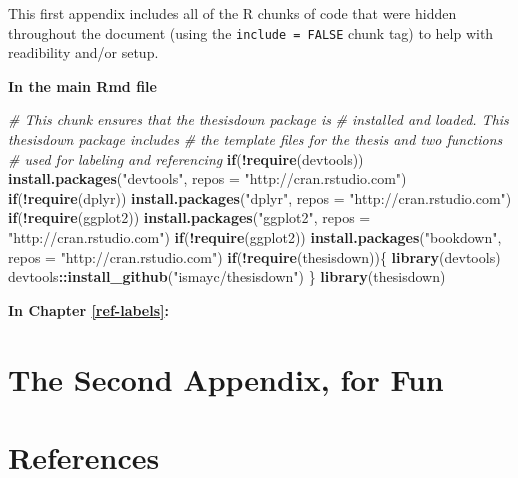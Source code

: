 \documentclass[12pt,twoside]{reedthesis}
\newenvironment{Shaded}{\begin{snugshade}}{\end{snugshade}}
\newcommand{\KeywordTok}[1]{\textcolor[rgb]{0.13,0.29,0.53}{\textbf{#1}}}
\newcommand{\DataTypeTok}[1]{\textcolor[rgb]{0.13,0.29,0.53}{#1}}
\newcommand{\StringTok}[1]{\textcolor[rgb]{0.31,0.60,0.02}{#1}}
\newcommand{\CommentTok}[1]{\textcolor[rgb]{0.56,0.35,0.01}{\textit{#1}}}
\newcommand{\ControlFlowTok}[1]{\textcolor[rgb]{0.13,0.29,0.53}{\textbf{#1}}}
\newcommand{\OperatorTok}[1]{\textcolor[rgb]{0.81,0.36,0.00}{\textbf{#1}}}
\newcommand{\NormalTok}[1]{#1}
\begin{document}
This first appendix includes all of the R chunks of code that were
hidden throughout the document (using the \texttt{include\ =\ FALSE}
chunk tag) to help with readibility and/or setup.

\textbf{In the main Rmd file}
\begin{Shaded}
\begin{Highlighting}[]
\CommentTok{# This chunk ensures that the thesisdown package is}
\CommentTok{# installed and loaded. This thesisdown package includes}
\CommentTok{# the template files for the thesis and two functions}
\CommentTok{# used for labeling and referencing}
\ControlFlowTok{if}\NormalTok{(}\OperatorTok{!}\KeywordTok{require}\NormalTok{(devtools))}
  \KeywordTok{install.packages}\NormalTok{(}\StringTok{"devtools"}\NormalTok{, }\DataTypeTok{repos =} \StringTok{"http://cran.rstudio.com"}\NormalTok{)}
\ControlFlowTok{if}\NormalTok{(}\OperatorTok{!}\KeywordTok{require}\NormalTok{(dplyr))}
    \KeywordTok{install.packages}\NormalTok{(}\StringTok{"dplyr"}\NormalTok{, }\DataTypeTok{repos =} \StringTok{"http://cran.rstudio.com"}\NormalTok{)}
\ControlFlowTok{if}\NormalTok{(}\OperatorTok{!}\KeywordTok{require}\NormalTok{(ggplot2))}
    \KeywordTok{install.packages}\NormalTok{(}\StringTok{"ggplot2"}\NormalTok{, }\DataTypeTok{repos =} \StringTok{"http://cran.rstudio.com"}\NormalTok{)}
\ControlFlowTok{if}\NormalTok{(}\OperatorTok{!}\KeywordTok{require}\NormalTok{(ggplot2))}
    \KeywordTok{install.packages}\NormalTok{(}\StringTok{"bookdown"}\NormalTok{, }\DataTypeTok{repos =} \StringTok{"http://cran.rstudio.com"}\NormalTok{)}
\ControlFlowTok{if}\NormalTok{(}\OperatorTok{!}\KeywordTok{require}\NormalTok{(thesisdown))\{}
  \KeywordTok{library}\NormalTok{(devtools)}
\NormalTok{  devtools}\OperatorTok{::}\KeywordTok{install_github}\NormalTok{(}\StringTok{"ismayc/thesisdown"}\NormalTok{)}
\NormalTok{  \}}
\KeywordTok{library}\NormalTok{(thesisdown)}
\end{Highlighting}
\end{Shaded}
\textbf{In Chapter \ref{ref-labels}:}

\chapter{The Second Appendix, for
Fun}\label{the-second-appendix-for-fun}

\backmatter

\chapter*{References}\label{references}
\end{document}
